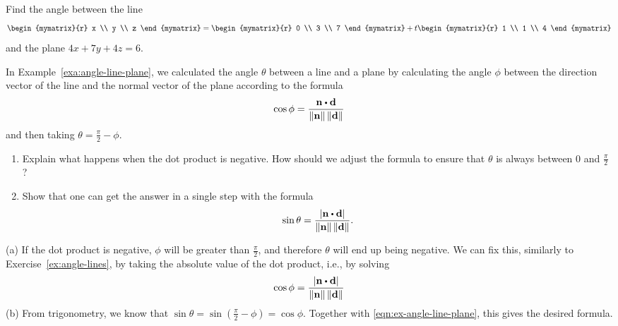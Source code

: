 \begin{enumialphparenastyle}
\begin{ex}
  Find the angle between the line
  \begin{equation*}
    \begin{mymatrix}{r} x \\ y \\ z \end{mymatrix}
    = \begin{mymatrix}{r} 0 \\ 3 \\ 7 \end{mymatrix}
    + t \begin{mymatrix}{r} 1 \\ 1 \\ 4 \end{mymatrix}
  \end{equation*}
  and the plane $4x+7y+4z = 6$.
\end{ex}

\begin{ex}
  In Example~\ref{exa:angle-line-plane}, we calculated the angle
  $\theta$ between a line and a plane by calculating the angle $\phi$
  between the direction vector of the line and the normal vector of
  the plane according to the formula
  \begin{equation*}
    \cos\phi =
    \frac{\vect{n}\dotprod\vect{d}}{\norm{\vect{n}}\norm{\vect{d}}}
  \end{equation*}
  and then taking $\theta = \frac{\pi}{2}-\phi$.
  \begin{enumerate}
  \item Explain what happens when the dot product is negative. How
    should we adjust the formula to ensure that $\theta$ is always
    between $0$ and $\frac{\pi}{2}$?
  \item Show that one can get the answer in a single step with the
    formula
    \begin{equation*}
      \sin\theta =
      \frac{\abs{\vect{n}\dotprod\vect{d}}}{\norm{\vect{n}}\norm{\vect{d}}}.
    \end{equation*}
  \end{enumerate}
  \begin{sol}
    (a) If the dot product is negative, $\phi$ will be greater than
    $\frac{\pi}{2}$, and therefore $\theta$ will end up being
    negative. We can fix this, similarly to
    Exercise~\ref{ex:angle-lines}, by taking the absolute value of the
    dot product, i.e., by solving
    \begin{equation}\label{eqn:ex-angle-line-plane}
      \cos\phi =
      \frac{\abs{\vect{n}\dotprod\vect{d}}}{\norm{\vect{n}}\norm{\vect{d}}}
    \end{equation}
    (b) From trigonometry, we know that $\sin\theta =
    \sin(\frac{\pi}{2}-\phi) = \cos\phi$. Together with
    {\eqref{eqn:ex-angle-line-plane}}, this gives the desired formula.
  \end{sol}
\end{ex}


\end{enumialphparenastyle}
